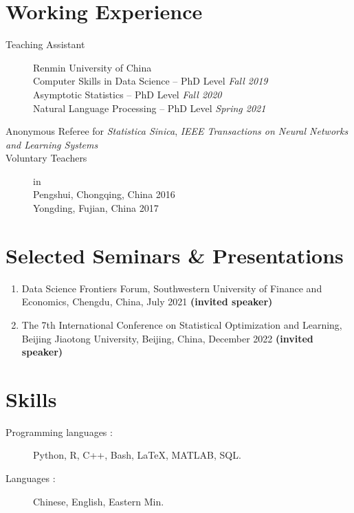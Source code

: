 \documentclass[margin,line]{resume-bib}
\begin{document}
\begin{resume}
\section{\mysidestyle Working Experience}\vspace{1mm}	     
\begin{description}
    \item[Teaching Assistant]\small{Renmin University of China} \\
            Computer Skills in Data Science -- PhD Level \hfill \textsl{Fall 2019} \\
            Asymptotic Statistics -- PhD Level \hfill \textsl{Fall 2020} \\
            Natural Language Processing -- PhD Level \hfill \textsl{Spring 2021} 
    \item[Anonymous Referee for {\it  Statistica Sinica}, {\it IEEE Transactions on Neural Networks and Learning Systems}]
    \item[Voluntary Teachers] in \\
    Pengshui, Chongqing, China \hfill 2016 \\
    Yongding, Fujian, China \hfill 2017
\end{description}

\section{\mysidestyle Selected Seminars {\footnotesize \&} Presentations} \vspace{1mm}	\vspace{1mm}	

\begin{enumerate}
\item Data Science Frontiers Forum, Southwestern University of Finance and Economics, Chengdu, China, July 2021 {\bf (invited speaker)}
\item The 7th International Conference on Statistical Optimization and Learning, Beijing Jiaotong University, Beijing, China, December 2022 {\bf (invited speaker)}
\end{enumerate}

\section{\mysidestyle Skills}\vspace{1mm}	  
\begin{description}
			\item[Programming languages $\!\!:$] Python, R, C++, Bash, \LaTeX, MATLAB, SQL.
			\item[Languages $\!\!:$] Chinese, English, Eastern Min.
\end{description}


\end{resume}
\end{document}
